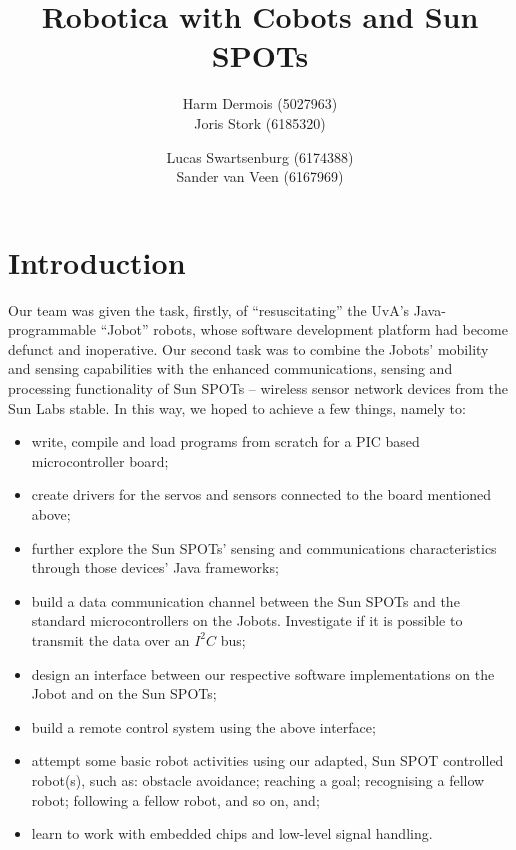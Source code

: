 \documentclass[a4paper,10pt]{article} %
\author{Harm Dermois (5027963) \\ Joris Stork (6185320) \and
Lucas Swartsenburg (6174388) \\ Sander van Veen (6167969)}
\title{Robotica with Cobots and Sun SPOTs}
\begin{document}
\maketitle


\tableofcontents

\pagebreak

\section{Introduction} %

Our team was given the task, firstly, of ``resuscitating'' the UvA's
Java-programmable ``Jobot'' robots, whose software development platform had
become defunct and inoperative. Our second task was to combine the Jobots'
mobility and sensing capabilities with the enhanced communications, sensing and
processing functionality of Sun SPOTs -- wireless sensor network devices from the
Sun Labs stable. In this way, we hoped to achieve a few things, namely to:

\begin{itemize}
    \item write, compile and load programs from scratch for a PIC based
    microcontroller board;
    \item create drivers for the servos and sensors connected to the board
    mentioned above;
    \item further explore the Sun SPOTs' sensing and communications
    characteristics through those devices' Java frameworks;
    \item build a data communication channel between the Sun SPOTs and the
    standard microcontrollers on the Jobots. Investigate if it is possible
    to transmit the data over an $I^2C$ bus;
    \item design an interface between our respective software implementations on
    the Jobot and on the Sun SPOTs;
    \item build a remote control system using the above interface;
    \item attempt some basic robot activities using our adapted, Sun SPOT
    controlled robot(s), such as: obstacle avoidance; reaching a goal;
    recognising a fellow robot; following a fellow robot, and so on, and;
    \item learn to work with embedded chips and low-level signal handling.
\end{itemize}
\end{document}
